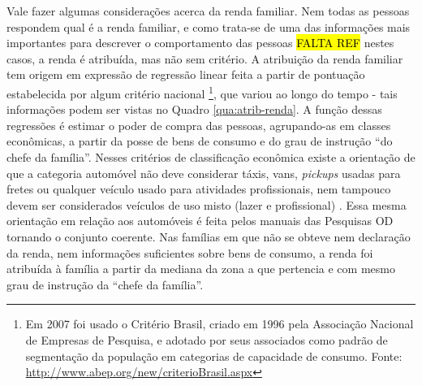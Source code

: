 Vale fazer algumas considerações acerca da renda familiar. Nem todas as pessoas respondem qual é a renda familiar, e como trata-se de uma das informações mais importantes para descrever o comportamento das pessoas \hl{FALTA REF} nestes casos, a renda é atribuída, mas não sem critério. A atribuição da renda familiar tem origem em expressão de regressão linear feita a partir de pontuação estabelecida por algum critério nacional%
\footnote{Em 2007 foi usado o Critério Brasil, criado em 1996 pela Associação Nacional de Empresas de Pesquisa, e adotado por seus associados como padrão de segmentação da população em categorias de capacidade de consumo. Fonte: \url{http://www.abep.org/new/criterioBrasil.aspx}}, que variou ao longo do tempo - tais informações podem ser vistas no Quadro \ref{qua:atrib-renda}. 
A função dessas regressões é estimar o poder de compra das pessoas, agrupando-as em classes econômicas, a partir da posse de bens de consumo e do grau de instrução ``do chefe da família''. Nesses critérios de classificação econômica existe a orientação de que a categoria automóvel não deve considerar táxis, vans, \emph{pickups} usadas para fretes ou qualquer veículo usado para atividades profissionais, nem tampouco devem ser considerados veículos de uso misto (lazer e profissional) \cite{CRITERIOBRASIL}. Essa mesma orientação em relação aos automóveis é feita pelos manuais das Pesquisas OD \cite{OD77, OD87, OD97, OD07} tornando o conjunto coerente.
Nas famílias em que não se obteve nem declaração da renda, nem informações suficientes sobre bens de consumo, a renda foi atribuída à família a partir da mediana da zona a que pertencia e com mesmo grau de instrução da ``chefe da família''.

